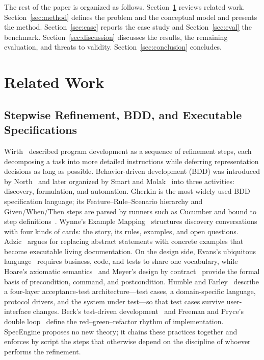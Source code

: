 \documentclass[conference]{IEEEtran}
\begin{document}
The rest of the paper is organized as follows. Section~\ref{sec:related} reviews related work. Section~\ref{sec:method} defines the problem and the conceptual model and presents the method. Section~\ref{sec:case} reports the case study and Section~\ref{sec:eval} the benchmark. Section~\ref{sec:discussion} discusses the results, the remaining evaluation, and threats to validity. Section~\ref{sec:conclusion} concludes.

\section{Related Work}\label{sec:related}

\subsection{Stepwise Refinement, BDD, and Executable Specifications}

Wirth~\cite{wirth1971stepwise} described program development as a sequence of refinement steps, each decomposing a task into more detailed instructions while deferring representation decisions as long as possible. Behavior-driven development (BDD) was introduced by North~\cite{north2006bdd} and later organized by Smart and Molak~\cite{smart2023bdd} into three activities: discovery, formulation, and automation. Gherkin is the most widely used BDD specification language; its Feature--Rule--Scenario hierarchy and Given/When/Then steps are parsed by runners such as Cucumber and bound to step definitions~\cite{cucumber2018gherkin}. Wynne's Example Mapping~\cite{wynne2015example} structures discovery conversations with four kinds of cards: the story, its rules, examples, and open questions. Adzic~\cite{adzic2011sbe} argues for replacing abstract statements with concrete examples that become executable living documentation. On the design side, Evans's ubiquitous language~\cite{evans2003ddd} requires business, code, and tests to share one vocabulary, while Hoare's axiomatic semantics~\cite{hoare1969axiomatic} and Meyer's design by contract~\cite{meyer1992dbc} provide the formal basis of precondition, command, and postcondition. Humble and Farley~\cite{humble2010cd,farley2021mse} describe a four-layer acceptance-test architecture---test cases, a domain-specific language, protocol drivers, and the system under test---so that test cases survive user-interface changes. Beck's test-driven development~\cite{beck2002tdd} and Freeman and Pryce's double loop~\cite{freeman2009goos} define the red--green--refactor rhythm of implementation. SpecEngine proposes no new theory; it chains these practices together and enforces by script the steps that otherwise depend on the discipline of whoever performs the refinement.
\end{document}
